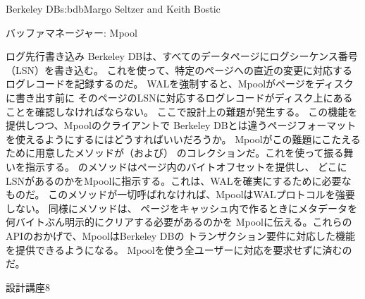 \begin{aosachapter}{Berkeley DB}{s:bdb}{Margo Seltzer and Keith Bostic}
\begin{aosasect1}{バッファマネージャー: Mpool}
\begin{aosasect2}{ログ先行書き込み}
Berkeley DBは、すべてのデータページにログシーケンス番号（LSN）を書き込む。
これを使って、特定のページへの直近の変更に対応するログレコードを記録するのだ。
WALを強制すると、Mpoolがページをディスクに書き出す前に
そのページのLSNに対応するログレコードがディスク上にあることを確認しなければならない。
ここで設計上の難題が発生する。
この機能を提供しつつ、Mpoolのクライアントで
Berkeley DBとは違うページフォーマットを使えるようにするにはどうすればいいだろうか。
Mpoolがこの難題にこたえるために用意したメソッドが（および）
のコレクションだ。これを使って振る舞いを指示する。
のメソッドはページ内のバイトオフセットを提供し、
どこにLSNがあるのかをMpoolに指示する。これは、WALを確実にするために必要なものだ。
このメソッドが一切呼ばれなければ、MpoolはWALプロトコルを強要しない。
同様にメソッドは、
ページをキャッシュ内で作るときにメタデータを何バイトぶん明示的にクリアする必要があるのかを
Mpoolに伝える。これらのAPIのおかげで、MpoolはBerkeley DBの
トランザクション要件に対応した機能を提供できるようになる。
Mpoolを使う全ユーザーに対応を要求せずに済むのだ。

\begin{aosabox}{設計講座8}


\end{aosabox}
\end{aosasect2}
\end{aosasect1}
\end{aosachapter}
